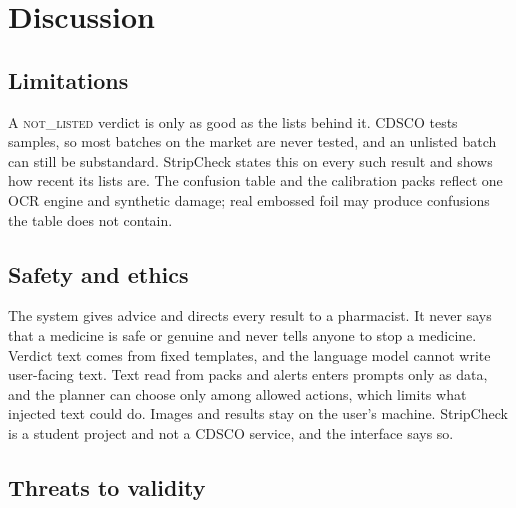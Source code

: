 \section{Discussion}
\label{sec:discussion}

\subsection{Limitations}
A \textsc{not\_listed} verdict is only as good as the lists behind it. CDSCO tests samples, so most batches on the market are never tested, and an unlisted batch can still be substandard. StripCheck states this on every such result and shows how recent its lists are. The confusion table and the calibration packs reflect one OCR engine and synthetic damage; real embossed foil may produce confusions the table does not contain. 

\subsection{Safety and ethics}
The system gives advice and directs every result to a pharmacist. It never says that a medicine is safe or genuine and never tells anyone to stop a medicine. Verdict text comes from fixed templates, and the language model cannot write user-facing text. Text read from packs and alerts enters prompts only as data, and the planner can choose only among allowed actions, which limits what injected text could do. Images and results stay on the user's machine. StripCheck is a student project and not a CDSCO service, and the interface says so. 

\subsection{Threats to validity}
